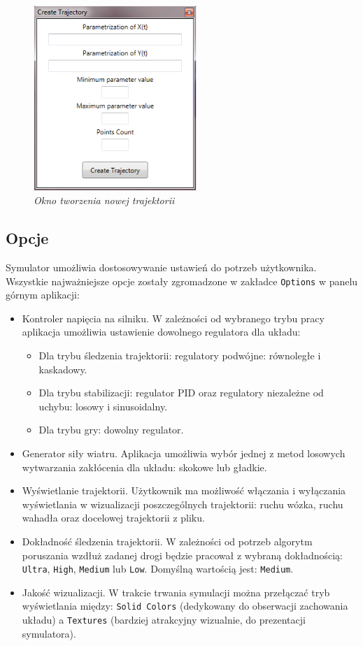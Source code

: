 \documentclass[12pt, twoside, openany]{report}
\theoremstyle{definition}
\begin{document}
\begin{figure}[H]
	\centering
		\includegraphics[width = 175pt]{CreateTrajectory} 
		\caption{\textit{Okno tworzenia nowej trajektorii}}
		\label{CreateTrajectory}
\end{figure}
\subsection{Opcje}
Symulator umożliwia dostosowywanie ustawień do potrzeb użytkownika. Wszystkie najważniejsze opcje zostały zgromadzone w zakładce \texttt{Options} w panelu górnym aplikacji:
\begin{itemize}
\item Kontroler napięcia na silniku. W zależności od wybranego trybu pracy aplikacja umożliwia ustawienie dowolnego regulatora dla układu:
\begin{itemize}
\item Dla trybu śledzenia trajektorii: regulatory podwójne: równoległe i kaskadowy.
\item Dla trybu stabilizacji: regulator PID oraz regulatory niezależne od uchybu: losowy i sinusoidalny.
\item Dla trybu gry: dowolny regulator.
\end{itemize}
\item Generator siły wiatru. Aplikacja umożliwia wybór jednej z metod losowych wytwarzania zakłócenia dla układu: skokowe lub gładkie.
\item Wyświetlanie trajektorii. Użytkownik ma możliwość włączania i wyłączania wyświetlania w wizualizacji poszczególnych trajektorii: ruchu wózka, ruchu wahadła oraz docelowej trajektorii z pliku.
\item Dokładność śledzenia trajektorii. W zależności od potrzeb algorytm poruszania wzdłuż zadanej drogi będzie pracował z wybraną dokładnością: \texttt{Ultra}, \texttt{High}, \texttt{Medium} lub \texttt{Low}. Domyślną wartością jest: \texttt{Medium}.
\item Jakość wizualizacji. W trakcie trwania symulacji można przełączać tryb wyświetlania między: \texttt{Solid Colors} (dedykowany do obserwacji zachowania układu) a \texttt{Textures} (bardziej atrakcyjny wizualnie, do prezentacji symulatora).
\end{itemize}
\end{document}
